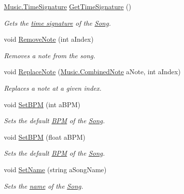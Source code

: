 \begin{DoxyCompactItemize}
\hyperlink{group___music_structs_struct_music_1_1_time_signature}{Music.\+Time\+Signature} \hyperlink{group___song_pub_func_ga26315bb6d554d46e2eba2ac03ee70cc1}{Get\+Time\+Signature} ()
\begin{DoxyCompactList}\small\item\em Gets the \hyperlink{group___music_structs_struct_music_1_1_time_signature}{time signature} of the \hyperlink{class_song}{Song}. \end{DoxyCompactList}\item 
void \hyperlink{group___song_pub_func_ga856634e047b8c35160958c3aa53d6b28}{Remove\+Note} (int a\+Index)
\begin{DoxyCompactList}\small\item\em Removes a note from the song. \end{DoxyCompactList}\item 
void \hyperlink{group___song_pub_func_ga326d61c75339080057a02c6decb0cde3}{Replace\+Note} (\hyperlink{group___music_structs_struct_music_1_1_combined_note}{Music.\+Combined\+Note} a\+Note, int a\+Index)
\begin{DoxyCompactList}\small\item\em Replaces a note at a given index. \end{DoxyCompactList}\item 
void \hyperlink{group___song_pub_func_gaa65bbba1af7192edff7e0f848029013b}{Set\+B\+PM} (int a\+B\+PM)
\begin{DoxyCompactList}\small\item\em Sets the default \hyperlink{group___audio_DefBPM}{B\+PM} of the \hyperlink{class_song}{Song}. \end{DoxyCompactList}\item 
void \hyperlink{group___song_pub_func_ga1efefe19fd0c5962f7f8ed16c65cd835}{Set\+B\+PM} (float a\+B\+PM)
\begin{DoxyCompactList}\small\item\em Sets the default \hyperlink{group___audio_DefBPM}{B\+PM} of the \hyperlink{class_song}{Song}. \end{DoxyCompactList}\item 
void \hyperlink{group___song_pub_func_gacb01510cf72657fc7c64bb6ba00c2c56}{Set\+Name} (string a\+Song\+Name)
\begin{DoxyCompactList}\small\item\em Sets the \hyperlink{group___song_priv_var_ga6a5e6c1e4aa92939e2b5c1e3d9908df8}{name} of the \hyperlink{class_song}{Song}. \end{DoxyCompactList}\item 

\end{DoxyCompactItemize}
